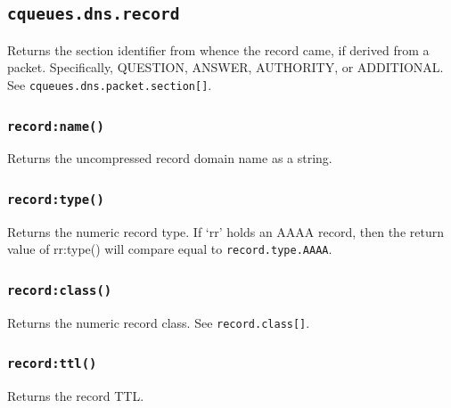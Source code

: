 \documentclass[11pt, oneside]{memoir}
\newcommand*{\fn}[1]{\texttt{#1}\xspace}
\newcommand*{\module}[1]{\texttt{#1}\xspace}
\newcounter{toccols}
\newenvironment{Module}[1]{
	\subsection{\texttt{#1}}
	\addtocontents{toc}{
		\protect\begin{multicols}{\value{toccols}}
	}
}{
	\addtocontents{toc}{\protect\end{multicols}}
}
\begin{document}
\begin{Module}{cqueues.dns.record}
Returns the section identifier from whence the record came, if derived from a packet. Specifically, QUESTION, ANSWER, AUTHORITY, or ADDITIONAL. See \module{cqueues.dns.packet.section[]}.

\subsubsection[\fn{record:name}]{\fn{record:name()}}

Returns the uncompressed record domain name as a string.

\subsubsection[\fn{record:type}]{\fn{record:type()}}

Returns the numeric record type. If `rr' holds an AAAA record, then the return value of rr:type() will compare equal to \module{record.type.AAAA}.

\subsubsection[\fn{record:class}]{\fn{record:class()}}

Returns the numeric record class. See \module{record.class[]}.

\subsubsection[\fn{record:ttl}]{\fn{record:ttl()}}

Returns the record TTL.

\end{Module}
\end{document}

